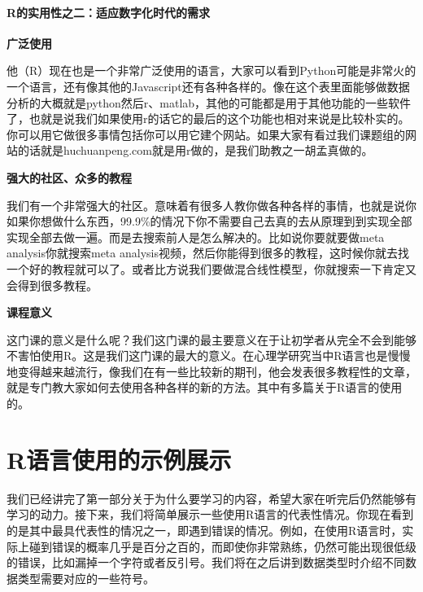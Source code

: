 \documentclass[
  oneside]{book}
\begin{document}
\hypertarget{rux7684ux5b9eux7528ux6027ux4e4bux4e8cux9002ux5e94ux6570ux5b57ux5316ux65f6ux4ee3ux7684ux9700ux6c42}{%
\paragraph{R的实用性之二：适应数字化时代的需求}\label{rux7684ux5b9eux7528ux6027ux4e4bux4e8cux9002ux5e94ux6570ux5b57ux5316ux65f6ux4ee3ux7684ux9700ux6c42}}

\textbf{广泛使用}

他（R）现在也是一个非常广泛使用的语言，大家可以看到Python可能是非常火的一个语言，还有像其他的Javascript还有各种各样的。像在这个表里面能够做数据分析的大概就是python然后r、matlab，其他的可能都是用于其他功能的一些软件了，也就是说我们如果使用r的话它的最后的这个功能也相对来说是比较朴实的。你可以用它做很多事情包括你可以用它建个网站。如果大家有看过我们课题组的网站的话就是huchuanpeng.com就是用r做的，是我们助教之一胡孟真做的。

\textbf{强大的社区、众多的教程}

我们有一个非常强大的社区。意味着有很多人教你做各种各样的事情，也就是说你如果你想做什么东西，99.9\%的情况下你不需要自己去真的去从原理到到实现全部实现全部去做一遍。而是去搜索前人是怎么解决的。比如说你要就要做meta
analysis你就搜索meta
analysis视频，然后你能得到很多的教程，这时候你就去找一个好的教程就可以了。或者比方说我们要做混合线性模型，你就搜索一下肯定又会得到很多教程。

\textbf{课程意义}

这门课的意义是什么呢？我们这门课的最主要意义在于让初学者从完全不会到能够不害怕使用R。这是我们这门课的最大的意义。在心理学研究当中R语言也是慢慢地变得越来越流行，像我们在有一些比较新的期刊，他会发表很多教程性的文章，就是专门教大家如何去使用各种各样的新的方法。其中有多篇关于R语言的使用的。

\hypertarget{rux8bedux8a00ux4f7fux7528ux7684ux793aux4f8bux5c55ux793a}{%
\section{R语言使用的示例展示}\label{rux8bedux8a00ux4f7fux7528ux7684ux793aux4f8bux5c55ux793a}}

我们已经讲完了第一部分关于为什么要学习的内容，希望大家在听完后仍然能够有学习的动力。接下来，我们将简单展示一些使用R语言的代表性情况。你现在看到的是其中最具代表性的情况之一，即遇到错误的情况。例如，在使用R语言时，实际上碰到错误的概率几乎是百分之百的，而即使你非常熟练，仍然可能出现很低级的错误，比如漏掉一个字符或者反引号。我们将在之后讲到数据类型时介绍不同数据类型需要对应的一些符号。
\end{document}
